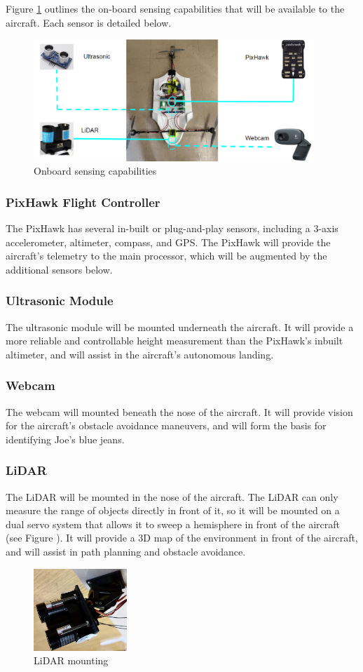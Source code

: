 Figure \ref{fig:sensing} outlines the on-board sensing capabilities that will be available to the aircraft. Each sensor is detailed below.

\begin{figure}[!h]
	\centering
	\includegraphics[width=300pt]{Images/sensors}
	\caption{Onboard sensing capabilities}
	\label{fig:sensing}
\end{figure}

\subsubsection*{PixHawk Flight Controller}
The PixHawk has several in-built or plug-and-play sensors, including a 3-axis accelerometer, altimeter, compass, and GPS. The PixHawk will provide the aircraft's telemetry to the main processor, which will be augmented by the additional sensors below.

\subsubsection*{Ultrasonic Module}
The ultrasonic module will be mounted underneath the aircraft. It will provide a more reliable and controllable height measurement than the PixHawk's inbuilt altimeter, and will assist in the aircraft's autonomous landing.

\subsubsection*{Webcam}
The webcam will mounted beneath the nose of the aircraft. It will provide vision for the aircraft's obstacle avoidance maneuvers, and will form the basis for identifying Joe's blue jeans.

\subsubsection*{LiDAR}
The LiDAR will be mounted in the nose of the aircraft. The LiDAR can only measure the range of objects directly in front of it, so it will be mounted on a dual servo system that allows it to sweep a hemisphere in front of the aircraft (see Figure ). It will provide a 3D map of the environment in front of the aircraft, and will assist in path planning and obstacle avoidance.

\begin{figure}[!h]
	\centering
	\includegraphics[width=100pt]{Images/lidar}
	\caption{LiDAR mounting}
	\label{fig:lidar}
\end{figure}
